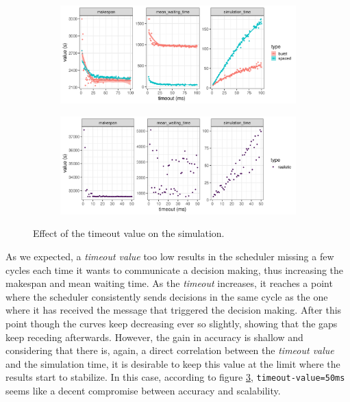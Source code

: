 \begin{figure}
	\begin{subfigure}{\textwidth}
		\centering
		\includegraphics[width=\textwidth]{imgs/timeout_burst_spaced.png}
		\caption{}
		\label{fig:timeout_burst_sp}
	\end{subfigure}

	\begin{subfigure}{\textwidth}
		\centering
		\includegraphics[width=\textwidth]{imgs/timeout_realistic.png}
		\caption{}
		\label{fig:timeout_real}
	\end{subfigure}

	\caption{Effect of the timeout value on the simulation.}
	\label{fig:timeout}
\end{figure}

As we expected, a \textit{timeout value} too low results in the scheduler
missing a few cycles each time it wants to communicate a decision making, thus
increasing the makespan and mean waiting time.  As the \textit{timeout}
increases, it reaches a point where the scheduler consistently sends decisions
in the same cycle as the one where it has received the message that triggered
the decision making. After this point though the curves keep decreasing ever so
slightly, showing that the gaps keep receding afterwards. However, the gain in
accuracy is shallow and considering that there is, again, a direct correlation
between the \textit{timeout value} and the simulation time, it is desirable to
keep this value at the limit where the results start to stabilize.  In this
case, according to figure \ref{fig:timeout}, \texttt{timeout-value=50ms} seems
like a decent compromise between accuracy and scalability.

